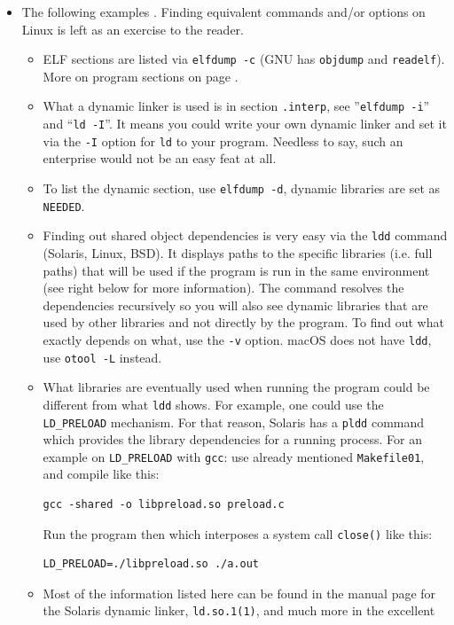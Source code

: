 \begin{itemize}
\item The following examples .  Finding equivalent
commands and/or options on Linux is left as an exercise to the reader.
\begin{itemize}
\item ELF sections are listed via \texttt{elfdump -c} (GNU has
\texttt{objdump} and \texttt{readelf}).  More on program sections on page
\pageref{ELF}.
\item What a dynamic linker is used is in section \texttt{.interp}, see
''\texttt{elf\-dump -i}'' and ``\texttt{ld -I}''.  It means you could write your
own dynamic linker and set it via the \texttt{-I} option for \texttt{ld} to your
program.  Needless to say, such an enterprise would not be an easy feat at
all.
\item To list the dynamic section, use \texttt{elfdump -d}, dynamic libraries
are set as \texttt{NEEDED}.
\item Finding out shared object dependencies is very easy via the
\texttt{ldd} command (Solaris, Linux, BSD).  It displays paths to the specific
libraries (i.e. full paths) that will be used if the program is run in the
same environment (see right below for more information).  The command resolves
the dependencies recursively so you will also see dynamic libraries that are used
by other libraries and not directly by the program.  To find out what exactly
depends on what, use the \texttt{-v} option.  macOS does not have \texttt{ldd},
use \texttt{otool -L} instead.
\item What libraries are eventually used when running the program could be
different from what \texttt{ldd} shows.  For example, 
one could use the \texttt{LD\_PRELOAD} mechanism.  For that reason,
Solaris has a \texttt{pldd} command which provides the library dependencies for
a running process.  For an example on \texttt{LD\_PRELOAD} with \texttt{gcc}:
use already mentioned \texttt{Ma\-ke\-file01}, and compile
 like this:
\begin{verbatim}
gcc -shared -o libpreload.so preload.c
\end{verbatim}
Run the program then which interposes a system
call \texttt{close()} like this:
\begin{verbatim}
LD_PRELOAD=./libpreload.so ./a.out
\end{verbatim}
\item Most of the information listed here can be found in the manual page for the
Solaris dynamic linker, \texttt{ld.so.1(1)}, and much more in the excellent

\end{itemize}
\end{itemize}
